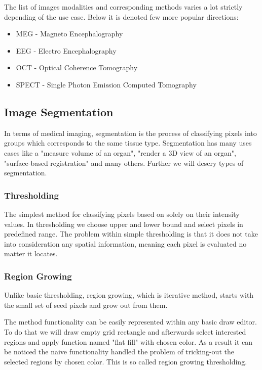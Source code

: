 The list of images modalities and corresponding methods varies a lot strictly depending of the use case.
Below it is denoted few more popular directions:
\begin{itemize}
    \item MEG - Magneto Encephalography
    \item EEG - Electro Encephalography
    \item OCT - Optical Coherence Tomography
    \item SPECT - Single Photon Emission Computed Tomography
\end{itemize}


\subsection{Image Segmentation}
In terms of medical imaging, segmentation is the process of classifying pixels into groups which corresponds to the same tissue type. Segmentation has many uses cases like a "measure volume of an organ", "render a 3D view of an organ", "surface-based registration" and many others. Further we will descry types of segmentation. 

\subsubsection{Thresholding}
The simplest method for classifying pixels based on solely on their intensity values. In thresholding we choose upper and lower bound and select pixels in predefined range.
The problem within simple thresholding is that it does not take into consideration any spatial information, meaning each pixel is evaluated no matter it locates.    

\subsubsection{Region Growing}
Unlike basic thresholding, region growing, which is iterative method, starts with the small set of seed pixels and grow out from them.

The method functionality can be easily represented within any basic draw editor. To do that we will draw empty grid rectangle and afterwards select interested regions and apply function named "flat fill" with chosen color. As a result it can be noticed the naive functionality handled the problem of tricking-out the selected regions by chosen color. This is so called region growing thresholding.    

